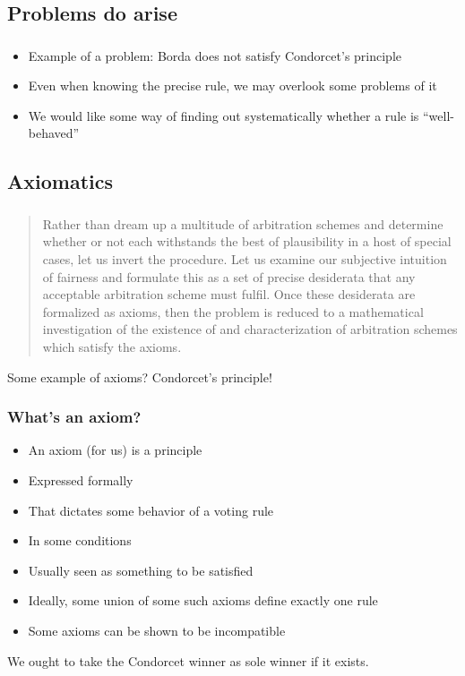 \documentclass[french,english]{beamer}
\begin{document}
\subsection[Problem]{Problems do arise}
\begin{frame}
	\frametitle{\subsecname}
	\begin{itemize}
		\item Example of a problem: Borda does not satisfy Condorcet’s principle
		\item Even when knowing the precise rule, we may overlook some problems of it
		\item We would like some way of finding out systematically whether a rule is “well-behaved”
	\end{itemize}
\end{frame}

\subsection{Axiomatics}
\begin{frame}
	\frametitle{\subsecname}
	\begin{quote}
		Rather than dream up a multitude of arbitration schemes and determine whether or not each withstands the best of plausibility in a host of special cases, let us invert the procedure. Let us examine our subjective intuition of fairness and formulate this as a set of precise desiderata that any acceptable arbitration scheme must fulfil. Once these desiderata are formalized as axioms, then the problem is reduced to a mathematical investigation of the existence of and characterization of arbitration schemes which satisfy the axioms.
	\end{quote}
	\citet[p. 121]{luce_games_1957}\par
	Some example of axioms? \pause Condorcet’s principle!
\end{frame}

\begin{frame}
	\frametitle{What’s an axiom?}
	\begin{itemize}
		\item An axiom (for us) is a principle
		\item Expressed formally
		\item That dictates some behavior of a voting rule
		\item In some conditions
		\item Usually seen as something to be satisfied
		\item Ideally, some union of some such axioms define exactly one rule
		\item Some axioms can be shown to be incompatible
	\end{itemize}
	\begin{example}
		We ought to take the Condorcet winner as sole winner if it exists.
	\end{example}
\end{frame}
\end{document}
